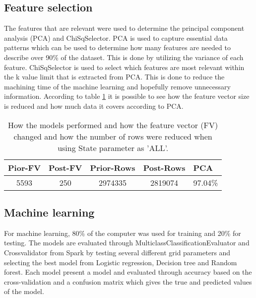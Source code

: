 \documentclass[../main.tex]{subfiles}
\begin{document}
\subsection{Feature selection}
The features that are relevant were used to determine the principal component analysis (PCA) and ChiSqSelector. PCA \cite{wold1987principal} is used to capture essential data patterns which can be used to determine how many features are needed to describe over 90\% of the dataset. This is done by utilizing the variance of each feature. ChiSqSelector \cite{liu1995chi2} is used to select which features are most relevant within the k value limit that is extracted from PCA. This is done to reduce the machining time of the machine learning and hopefully remove unnecessary information. According to table \ref{tab:feature_select} it is possible to see how the feature vector size is reduced and how much data it covers according to PCA.

\begin{table}[H]
\centering
\begin{tabular}{ccccc} \hline
\multicolumn{1}{l}{\textbf{Pior-FV}} & \multicolumn{1}{l}{\textbf{Post-FV}} & \multicolumn{1}{l}{\textbf{Prior-Rows}} & \multicolumn{1}{l}{\textbf{Post-Rows}} & \multicolumn{1}{l}{\textbf{PCA}} \\ \hline
 5593 & 250 & 2974335 & 2819074 & 97.04\% \\ \hline
\end{tabular}
\caption{How the models performed and how the feature vector (FV) changed and how the number of rows were reduced when using State parameter as 'ALL'.}
\label{tab:feature_select}
\end{table}
\subsection{Machine learning}

For machine learning, 80\% of the computer was used for training and 20\% for testing. The models are evaluated through MulticlassClassificationEvaluator and Crossvalidator from Spark by testing several different grid parameters and selecting the best model from Logistic regression, Decision tree and Random forest. Each model present a model and evaluated through accuracy based on the cross-validation and a confusion matrix which gives the true and predicted values of the model.
\end{document}
